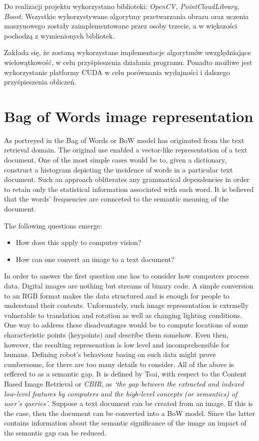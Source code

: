 \documentclass[a4paper,10pt]{article}
\begin{document}
  Do realizacji projektu wykorzystano biblioteki: \emph{OpenCV, PointCloudLibrary, Boost}. Wszystkie wykorzystywane algorytmy przetwarzania obrazu oraz uczenia maszynowego zostały zaimplementowane przez osoby trzecie, a w większości pochodzą z wymienionych bibliotek.
  
  Zakłada się, że zostaną wykorzystane implementacje algorytmów uwzględniające wielowątkowość, w celu przyśpieszenia działania programu. Ponadto możliwe jest wykorzystanie platformy CUDA w celu porównania wydajności i dalszego przyśpieszenia obliczeń.
 
\section{Bag of Words image representation}

  As portreyed in \cite{tsai2012bag} the Bag of Words or BoW model has originated from the text retrieval domain. The original use enabled a vector-like representation of a text document. One of the most simple cases would be to, given a dictionary, construct a histogram depicting the incidence of words in a particular text document. Such an approach obliterates any grammatical dependencies in order to retain only the statistical information associated with each word. It is believed that the words' frequencies are connceted to the semantic meaning of the document.
  
  The following questions emerge: 
  \begin{itemize}
    \item How does this apply to computer vision?
    \item How can one convert an image to a text document? 
  \end{itemize}
  
  In order to answer the first question one has to consider how computers process data. Digital images are nothing but streams of binary code. A simple conversion to an RGB format makes the data structured and is enough for people to understand their contents. Unforunately, such image representation is extrmelly vulnerable to translation and rotation as well as changing lighting conditions. One way to address these disadvantages would be to compute locations of some characteristic points (keypoints) and describe them somehow. Even then, however, the resulting represenation is low level and incomprehensible for humans. Defining robot's behaviour basing on such data might prove cumbersome, for there are too many details to consider. All of the above is reffered to as a semantic gap. It is defined by Tsai, with respect to the Content Based Image Retrieval or \textit{CBIR}, as \emph{`the gap between the extracted and indexed low-level features by computers and the high-level concepts (or semantics) of user’s queries'}. Suppose a text document can be created from an image. If this is the case, then the document can be converted into a BoW model. Since the latter contains information about the semantic significance of the image an impact of the semantic gap can be reduced.
  
\end{document}
